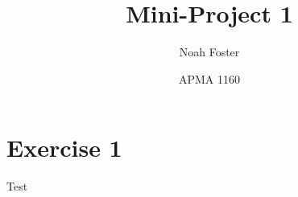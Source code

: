 \documentclass{article}
\title{Mini-Project 1}
\author{Noah Foster}
\date{APMA 1160}
\begin{document}
\maketitle
\section*{Exercise 1}
Test
\end{document}
